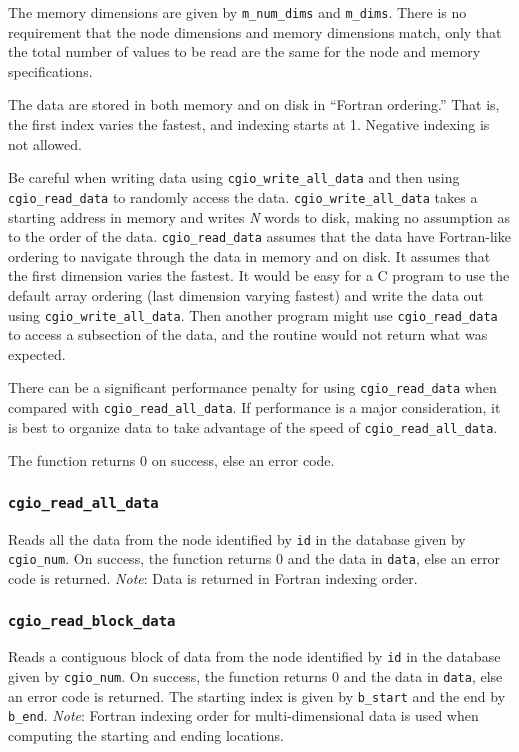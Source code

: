     \noindent
    The memory dimensions are given by \texttt{m\_num\_dims} and \texttt{m\_dims}.
    There is no requirement that the node dimensions and memory dimensions
    match, only that the total number of values to be read are the same
    for the node and memory specifications.

    \noindent
    The data are stored in both memory and on disk in ``Fortran ordering.''
    That is, the first index varies the fastest, and indexing starts at 1.
    Negative indexing is not allowed.

    \noindent
    Be careful when writing data using
    \texttt{cgio\_write\_all\_data} and then using
    \texttt{cgio\_read\_data} to randomly access the data.
    \texttt{cgio\_write\_all\_data} takes a starting address in memory and
    writes \textit{N} words to disk, making no assumption as to the order of
    the data.
    \texttt{cgio\_read\_data} assumes that the data have Fortran-like
    ordering to navigate through the data in memory and on disk.
    It assumes that the first dimension varies the fastest.
    It would be easy for a C program to use the default array ordering
    (last dimension varying fastest) and write the data out using
    \texttt{cgio\_write\_all\_data}. Then another program might use
    \texttt{cgio\_read\_data} to access a subsection of the data, and the
    routine would not return what was expected.

    \noindent
    There can be a significant performance penalty for using
    \texttt{cgio\_read\_data} when compared with
    \texttt{cgio\_read\_all\_data}.
    If performance is a major consideration, it is best to organize
    data to take advantage of the speed of \texttt{cgio\_read\_all\_data}.

    \noindent
    The function returns 0 on success, else an error code.

\subsubsection{\texttt{cgio\_read\_all\_data}} \label{read_all_data}
    \noindent
    Reads all the data from the node identified by \texttt{id} in the
    database given by \texttt{cgio\_num}. On success, the function
    returns 0 and the data in \texttt{data}, else an error code is returned.
    \textit{Note}: Data is returned in Fortran indexing order.

\subsubsection{\texttt{cgio\_read\_block\_data}} \label{read_block_data}
    \noindent
    Reads a contiguous block of data from the node identified by \texttt{id}
    in the database given by \texttt{cgio\_num}. On success, the function
    returns 0 and the data in \texttt{data}, else an error code is returned.
    The starting index is given by \texttt{b\_start} and the end by
    \texttt{b\_end}.
    \textit{Note}: Fortran indexing order for multi-dimensional data is used
    when computing the starting and ending locations.

